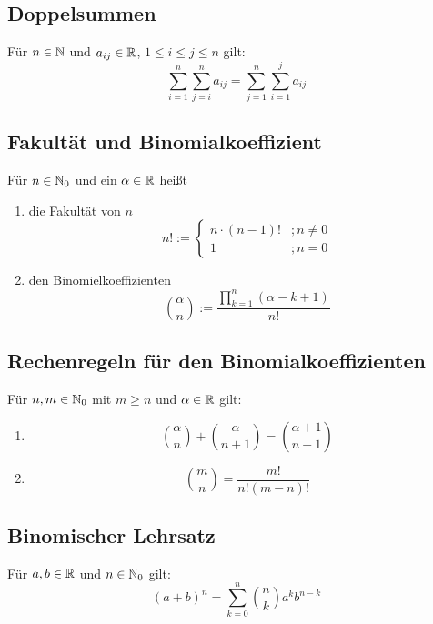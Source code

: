 \subsection{Doppelsummen}
Für $n \in \mathbb{N}$ und $a_{ij} \in \mathbb{R}$, $1 \leq i \leq j \leq n$ gilt:
\begin{equation*}
    \sum_{i=1}^n \sum_{j=i}^n a_{ij} = \sum_{j=1}^n \sum_{i=1}^j a_{ij}
\end{equation*}

\subsection{Fakultät und Binomialkoeffizient}
Für $n \in \mathbb{N}_0$ und ein $\alpha \in \mathbb{R}$ heißt
\begin{enumerate}[label= (\alph*)]
    \item die Fakultät von $n$
        \begin{equation*}
            n! := \begin{cases}
                n \cdot (n-1)!&;n \neq 0\\
                1&;n=0
            \end{cases}
        \end{equation*}
    \item den Binomielkoeffizienten
        \begin{equation*}
            {\alpha \choose n} := \frac{\prod\limits_{k=1}^n (\alpha-k+1)}{n!}
        \end{equation*}
\end{enumerate}

\subsection{Rechenregeln für den Binomialkoeffizienten}
Für $n, m \in \mathbb{N}_0$ mit $m \geq n$ und $\alpha \in \mathbb{R}$ gilt:
\begin{enumerate}[label= (\alph*)]
    \item
        \begin{equation*}
            {\alpha \choose n} + {\alpha \choose n+1} =
            {\alpha + 1 \choose n +1}
        \end{equation*}
     \item
        \begin{equation*}
            {m \choose n} = \frac{m!}{n!(m-n)!}
        \end{equation*}
\end{enumerate}

\subsection{Binomischer Lehrsatz}
Für $a, b \in \mathbb{R}$ und $n \in \mathbb{N}_0$ gilt:
\begin{equation*}
    {(a+b)}^n = \sum_{k=0}^n {n \choose k} a^k b^{n-k}
\end{equation*}

